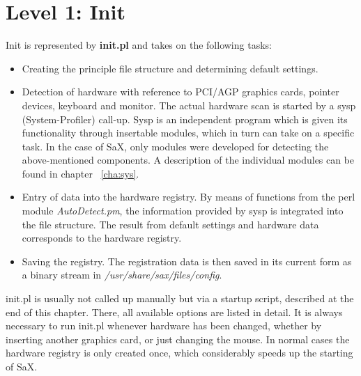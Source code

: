 \section{Level 1: Init}
\label{sec:le1}
Init is represented by  \textbf{init.pl} and takes on the following tasks:\\
\begin{itemize}
\item Creating the principle file structure and determining default settings.
\item Detection of hardware with reference to PCI/AGP graphics cards, pointer
  devices, keyboard and monitor. The actual hardware scan is started by a sysp
  (System-Profiler) call-up. Sysp is an independent program which is given its
  functionality through insertable modules, which in turn can take on a
  specific task. In the case of SaX, only modules were developed for detecting
  the above-mentioned components. A description of the individual modules can
  be found in chapter ~\ref{cha:sys}.
\item Entry of data into the hardware registry. By means of functions from the
  perl module \textit{AutoDetect.pm}, the information provided by sysp is
  integrated into the file structure. The result from default settings and
  hardware data corresponds to the hardware registry.
\item Saving the registry. The registration data is then saved in its current
  form as a binary stream in \textit{/usr/share/sax/files/config}. 
\end{itemize}

init.pl is usually not called up manually but via a startup script, described
at the end of this chapter. There, all available options are listed in
detail. It is always necessary to run init.pl whenever hardware has been
changed, whether by inserting another graphics card, or just changing the
mouse. In normal cases the hardware registry is only created once, which
considerably speeds up the starting of SaX. 

